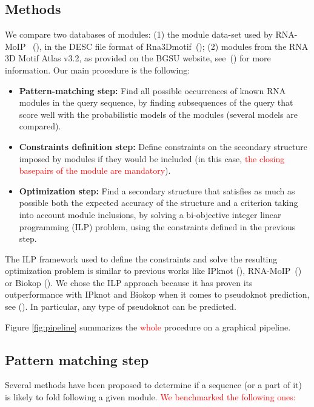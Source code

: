 \documentclass{bioinfo}
\begin{document}
\begin{methods}
\section{Methods}\label{sec:methods}
We compare two databases of modules: (1) the module data-set used by RNA-MoIP ~(\citealp{reinharz_towards_2012}), in the DESC file format of Rna3Dmotif~(\citealp{djelloul_automated_2008}); (2) modules from the RNA 3D Motif Atlas v3.2, as provided on the BGSU website, see~(\citealp{petrov_automated_2013}) for more information. Our main procedure is the following:
\begin{itemize}
\item \textbf{Pattern-matching step:} Find all possible occurrences of known RNA modules in the query sequence, by finding subsequences of the query that score well with the probabilistic models of the modules (several models are compared).
\item \textbf{Constraints definition step:} Define constraints on the secondary structure imposed by modules if they would be included (in this case, \textcolor{red}{the closing basepairs of the module are mandatory}).
 \item \textbf{Optimization step:} Find a secondary structure that satisfies as much as possible both the expected accuracy of the structure and a criterion taking into account module inclusions, by solving a bi-objective integer linear programming (ILP) problem, using the constraints defined in the previous step.
\end{itemize}
 
The ILP framework used to define the constraints and solve the resulting optimization problem is similar to previous works like IPknot (\citealp{sato_ipknot:_2011}), RNA-MoIP~(\citealp{reinharz_towards_2012}) or Biokop (\citealp{legendre_bi-objective_2018}).
We chose the ILP approach because it has proven its outperformance with IPknot and Biokop when it comes to pseudoknot prediction, see (\citealp{legendre_bi-objective_2018}). In particular, any type of pseudoknot can be predicted. 

Figure \ref{fig:pipeline} summarizes the \textcolor{red}{whole} procedure on a graphical pipeline.

\subsection{Pattern matching step}\label{sec:models}
Several methods have been proposed to determine if a sequence (or a part of it) is likely to fold following a given module. \textcolor{red}{We benchmarked the following ones:}


\end{methods}
\end{document}
